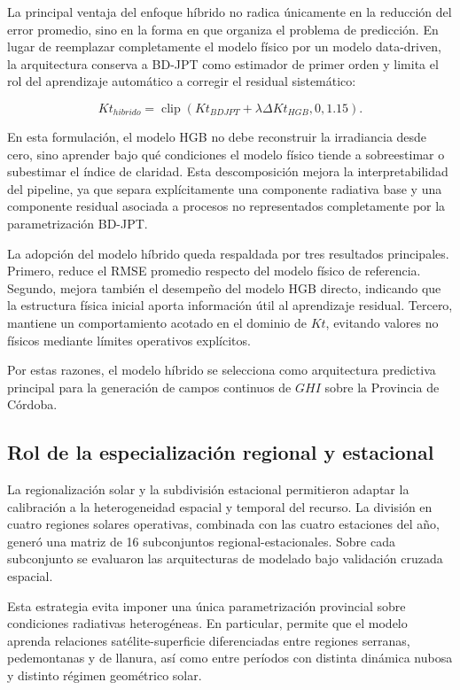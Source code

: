 \documentclass[../main.tex]{subfiles}
\begin{document}
La principal ventaja del enfoque híbrido no radica únicamente en la reducción del error promedio, sino en la forma en que organiza el problema de predicción. En lugar de reemplazar completamente el modelo físico por un modelo data-driven, la arquitectura conserva a BD-JPT como estimador de primer orden y limita el rol del aprendizaje automático a corregir el residual sistemático:

\begin{equation}
Kt_{hibrido}
=
\operatorname{clip}
\left(
Kt_{BDJPT}
+
\lambda \Delta Kt_{HGB},
0,
1.15
\right).
\end{equation}

En esta formulación, el modelo HGB no debe reconstruir la irradiancia desde cero, sino aprender bajo qué condiciones el modelo físico tiende a sobreestimar o subestimar el índice de claridad. Esta descomposición mejora la interpretabilidad del pipeline, ya que separa explícitamente una componente radiativa base y una componente residual asociada a procesos no representados completamente por la parametrización BD-JPT.

La adopción del modelo híbrido queda respaldada por tres resultados principales. Primero, reduce el RMSE promedio respecto del modelo físico de referencia. Segundo, mejora también el desempeño del modelo HGB directo, indicando que la estructura física inicial aporta información útil al aprendizaje residual. Tercero, mantiene un comportamiento acotado en el dominio de $Kt$, evitando valores no físicos mediante límites operativos explícitos.

Por estas razones, el modelo híbrido se selecciona como arquitectura predictiva principal para la generación de campos continuos de $GHI$ sobre la Provincia de Córdoba.

\subsection{Rol de la especialización regional y estacional}

La regionalización solar y la subdivisión estacional permitieron adaptar la calibración a la heterogeneidad espacial y temporal del recurso. La división en cuatro regiones solares operativas, combinada con las cuatro estaciones del año, generó una matriz de 16 subconjuntos regional-estacionales. Sobre cada subconjunto se evaluaron las arquitecturas de modelado bajo validación cruzada espacial.

Esta estrategia evita imponer una única parametrización provincial sobre condiciones radiativas heterogéneas. En particular, permite que el modelo aprenda relaciones satélite-superficie diferenciadas entre regiones serranas, pedemontanas y de llanura, así como entre períodos con distinta dinámica nubosa y distinto régimen geométrico solar.
\end{document}
